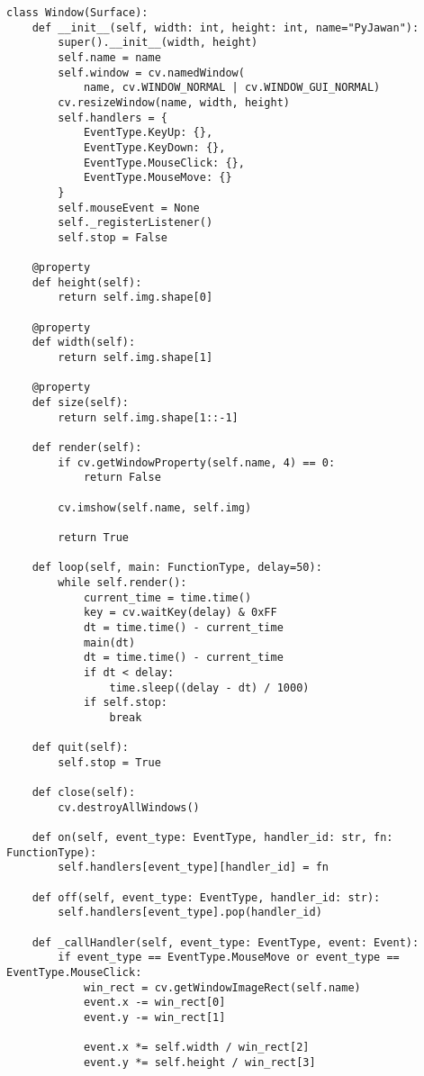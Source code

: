 \documentclass[11pt]{article}
\begin{document}
\begin{lstlisting}
class Window(Surface):
    def __init__(self, width: int, height: int, name="PyJawan"):
        super().__init__(width, height)
        self.name = name
        self.window = cv.namedWindow(
            name, cv.WINDOW_NORMAL | cv.WINDOW_GUI_NORMAL)
        cv.resizeWindow(name, width, height)
        self.handlers = {
            EventType.KeyUp: {},
            EventType.KeyDown: {},
            EventType.MouseClick: {},
            EventType.MouseMove: {}
        }
        self.mouseEvent = None
        self._registerListener()
        self.stop = False

    @property
    def height(self):
        return self.img.shape[0]

    @property
    def width(self):
        return self.img.shape[1]

    @property
    def size(self):
        return self.img.shape[1::-1]

    def render(self):
        if cv.getWindowProperty(self.name, 4) == 0:
            return False

        cv.imshow(self.name, self.img)

        return True

    def loop(self, main: FunctionType, delay=50):
        while self.render():
            current_time = time.time()
            key = cv.waitKey(delay) & 0xFF
            dt = time.time() - current_time
            main(dt)
            dt = time.time() - current_time
            if dt < delay:
                time.sleep((delay - dt) / 1000)
            if self.stop:
                break

    def quit(self):
        self.stop = True

    def close(self):
        cv.destroyAllWindows()

    def on(self, event_type: EventType, handler_id: str, fn: FunctionType):
        self.handlers[event_type][handler_id] = fn

    def off(self, event_type: EventType, handler_id: str):
        self.handlers[event_type].pop(handler_id)

    def _callHandler(self, event_type: EventType, event: Event):
        if event_type == EventType.MouseMove or event_type == EventType.MouseClick:
            win_rect = cv.getWindowImageRect(self.name)
            event.x -= win_rect[0]
            event.y -= win_rect[1]

            event.x *= self.width / win_rect[2]
            event.y *= self.height / win_rect[3]


\end{lstlisting}
\end{document}
